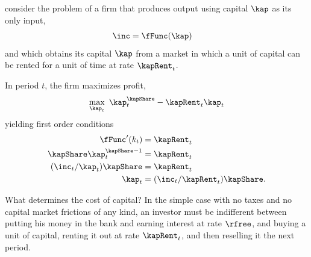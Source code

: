 \cite{hall&jorgenson:i} consider the problem of a firm that produces output
using capital $\kap$ as its only input,
\begin{equation}\begin{gathered}\begin{aligned}
       \inc  & =  \fFunc(\kap)
\end{aligned}\end{gathered}\end{equation}
and which obtains its capital $\kap$ from a market in which a unit
of capital can be rented for a unit of time at rate
 $\kapRent_{t}$.

In period $t$, the firm maximizes profit,
\begin{displaymath}
        \max_{\kap_{t}} ~ \kap_{t}^{\kapShare}-\kapRent_{t}\kap_{t}
\end{displaymath}
yielding first order conditions
\begin{equation}\begin{gathered}\begin{aligned}
\fFunc^{\prime}(k_{t}) & =  \kapRent_{t}
\\        \kapShare \kap_{t}^{\kapShare-1} & =  \kapRent_{t}  \\
         (\inc_{t}/\kap_{t}) \kapShare & =  \kapRent_{t}  \\
        \kap_{t} & =  (\inc_{t}/\kapRent_{t})\kapShare . \label{eq:khj}
\end{aligned}\end{gathered}\end{equation}

What determines the cost of capital?  In the simple case with no taxes and no
capital market frictions of any kind, an investor must be indifferent
between putting his money in the bank and earning interest at rate
$\rfree$, and buying a unit of capital, renting it out at rate $\kapRent_{t}$, and
then reselling it the next period.

